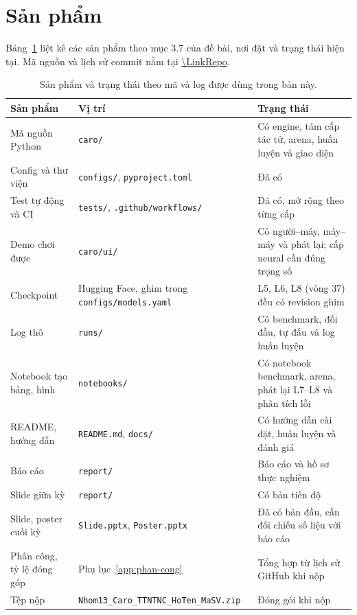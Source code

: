 \section{Sản phẩm}
\label{sec:gt-san-pham}
Bảng~\ref{tab:gt-san-pham} liệt kê các sản phẩm theo mục 3.7 của đề bài, nơi đặt và trạng thái hiện tại. Mã nguồn và lịch sử commit nằm tại \url{\LinkRepo}.

\begin{table}[!htb]
  \centering\small
  \caption{Sản phẩm và trạng thái theo mã và log được dùng trong bản này.}
  \label{tab:gt-san-pham}
  \begin{tabularx}{\textwidth}{@{}>{\raggedright\arraybackslash}p{} >{\raggedright\arraybackslash}p{} >{\raggedright\arraybackslash}X@{}}
    \toprule
    \textbf{Sản phẩm} & \textbf{Vị trí} & \textbf{Trạng thái} \\
    \midrule
    Mã nguồn Python & \texttt{caro/} & Có engine, tám cấp tác tử, arena, huấn luyện và giao diện \\
    Config và thư viện & \texttt{configs/}, \texttt{pyproject.toml} & Đã có \\
    Test tự động và CI & \texttt{tests/}, \texttt{.github/workflows/} & Đã có, mở rộng theo từng cấp \\
    Demo chơi được & \texttt{caro/ui/} & Có người--máy, máy--máy và phát lại; cấp neural cần đúng trọng số \\
    Checkpoint & Hugging Face, ghim trong \texttt{configs/models.yaml} & L5, L6, L8 (vòng 37) đều có revision ghim \\
    Log thô & \texttt{runs/} & Có benchmark, đối đầu, tự đấu và log huấn luyện \\
    Notebook tạo bảng, hình & \texttt{notebooks/} & Có notebook benchmark, arena, phát lại L7--L8 và phân tích lỗi \\
    README, hướng dẫn & \texttt{README.md}, \texttt{docs/} & Có hướng dẫn cài đặt, huấn luyện và đánh giá \\
    Báo cáo & \texttt{report/} & Báo cáo và hồ sơ thực nghiệm \\
    Slide giữa kỳ & \texttt{report/} & Có bản tiến độ \\
    Slide, poster cuối kỳ & \texttt{Slide.pptx}, \texttt{Poster.pptx} & Đã có bản đầu, cần đối chiếu số liệu với báo cáo \\
    Phân công, tỷ lệ đóng góp & Phụ lục~\ref{app:phan-cong} & Tổng hợp từ lịch sử GitHub khi nộp \\
    Tệp nộp & \texttt{Nhom13\_Caro\_TTNTNC\_HoTen\_MaSV.zip} & Đóng gói khi nộp \\
    \bottomrule
  \end{tabularx}
\end{table}
